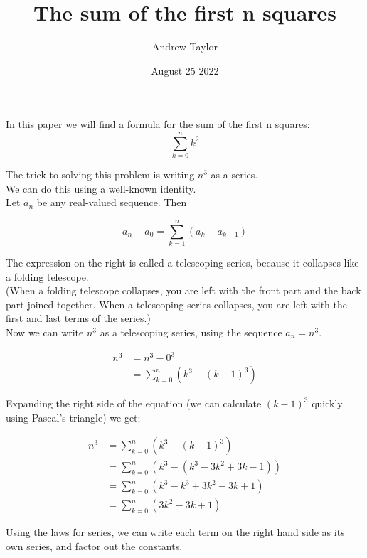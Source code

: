 \documentclass{article}
\title{The sum of the first n squares}
\author{Andrew Taylor}
\date{August 25 2022}
\begin{document}
\maketitle

In this paper we will find a formula for the sum of the first n squares: $$ \sum_{k=0}^{n} k^{2} $$

The trick to solving this problem is writing $n^3$ as a series. \\

We can do this using a well-known identity. \\

Let $a_n$ be any real-valued sequence. Then

\begin{equation*}
a_{n} - a_{0} = \sum_{k=1}^{n} \left( a_{k} - a_{k-1} \right)
\end{equation*}

The expression on the right is called a telescoping series, because it collapses like a folding telescope. \\

(When a folding telescope collapses, you are left with the front part and the back part joined together. When a telescoping series collapses, you are left with the first and last terms of the series.) \\

Now we can write $n^3$ as a telescoping series, using the sequence $a_{n} = n^{3}$.

\begin{align*}
n^3 &= n^3 - 0^3 \\
&= \sum_{k=0}^{n} \left( k^3 - (k-1)^3 \right)
\end{align*}

Expanding the right side of the equation (we can calculate $(k-1)^3$ quickly using Pascal's triangle) we get:

\begin{align*}
n^3 &= \sum_{k=0}^{n} \left( k^3 - (k-1)^3 \right) \\
&= \sum_{k=0}^{n} \left( k^3 - (k^3 - 3k^2 + 3k - 1) \right) \\
&= \sum_{k=0}^{n} \left( k^3 - k^3 + 3k^2 - 3k + 1 \right) \\
&= \sum_{k=0}^{n} \left( 3k^2 - 3k + 1 \right) 
\end{align*}

Using the laws for series, we can write each term on the right hand side as its own series, and factor out the constants. \\
\end{document}
